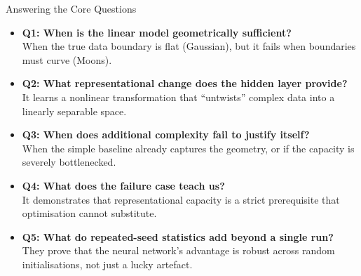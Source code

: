 \documentclass[11pt,aspectratio=169]{beamer}
\begin{document}
\begin{frame}{Answering the Core Questions}
\small
\begin{itemize}\itemsep0.8em
    \item \textcolor{softteal}{\textbf{Q1: When is the linear model geometrically sufficient?}} \\
    When the true data boundary is flat (Gaussian), but it fails when boundaries must curve (Moons).

    \item \textcolor{softteal}{\textbf{Q2: What representational change does the hidden layer provide?}} \\
    It learns a nonlinear transformation that ``untwists'' complex data into a linearly separable space.

    \item \textcolor{softteal}{\textbf{Q3: When does additional complexity fail to justify itself?}} \\
    When the simple baseline already captures the geometry, or if the capacity is severely bottlenecked.

    \item \textcolor{softteal}{\textbf{Q4: What does the failure case teach us?}} \\
    It demonstrates that representational capacity is a strict prerequisite that optimisation cannot substitute.

    \item \textcolor{softteal}{\textbf{Q5: What do repeated-seed statistics add beyond a single run?}} \\
    They prove that the neural network's advantage is robust across random initialisations, not just a lucky artefact.
\end{itemize}

\end{frame}
\end{document}
